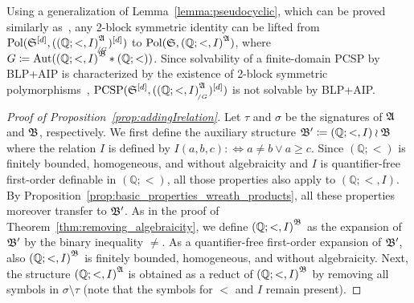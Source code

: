 Using a generalization of Lemma~\ref{lemma:pseudocyclic}, which can be proved similarly as~\cite[Lemma~33]{Mottet_2025}, any 2-block symmetric identity can be lifted from $\Pol(\fpwr{\struct{S}}{d},{\smash{({(\mathbb{Q};<,I)}^{\struct{A}}_{\orbeq{G}})}}^{[d]} )$ to $\mathrm{Pol}(\mathfrak{S},{(\mathbb{Q};<,I)}^{\mathfrak{A}})$, where $G\mathrel{\mathop:}\mathrel{\mkern-1.2mu}= \mathrm{Aut}({(\mathbb{Q};<,I)}^{\mathfrak{B}}\ast (\mathbb{Q};<))$.
%
Since solvability of a finite-domain PCSP by BLP+AIP is characterized by the existence of 2-block symmetric polymorphisms~\cite[Theorem 4]{BLP_AIP}, $\PCSP(\fpwr{\struct{S}}{d},{\smash{({(\mathbb{Q};<,I)}^{\struct{A}}_{\orbeq{G}})}}^{[d]} )$ is not solvable by BLP+AIP.
%    
\begin{proof}[Proof of Proposition~\ref{prop:addingIrelation}]
Let $\tau$ and $\sigma$ be the signatures of $\mathfrak{A}$ and $\mathfrak{B}$, respectively.
%
We first define the auxiliary structure $\mathfrak{B}'\mathrel{\mathop:}\mathrel{\mkern-1.2mu}=  (\mathbb{Q};<,I) \wr \mathfrak{B}$ where the relation $I$ is defined by $I(a,b,c):\Leftrightarrow a\neq b\vee a\geq c$. 
%
Since $(\mathbb{Q};<)$ is finitely bounded, homogeneous, and without algebraicity and $I$ is quantifier-free first-order definable in $(\mathbb{Q};<)$, all those properties also apply to $(\mathbb{Q};<,I)$.
%
By Proposition~\ref{prop:basic_properties_wreath_products}, all these properties moreover transfer to $\mathfrak{B}'$.
%
As in the proof of Theorem~\ref{thm:removing_algebraicity}, we define ${(\mathbb{Q};<,I)}^{\mathfrak{B}}$ as the expansion of $\mathfrak{B}'$ by the binary inequality $\neq$.
%
As a quantifier-free first-order expansion of $\mathfrak{B}'$, also ${(\mathbb{Q};<,I)}^{\mathfrak{B}}$ is finitely bounded, homogeneous, and without algebraicity.
%
Next, the structure ${(\mathbb{Q};<,I)}^{\mathfrak{A}}$ is obtained as a reduct of ${(\mathbb{Q};<,I)}^{\mathfrak{B}}$ by removing all symbols in $\sigma\setminus \tau$ (note that the symbols for $<$ and $I$ remain present).
%


\end{proof}
